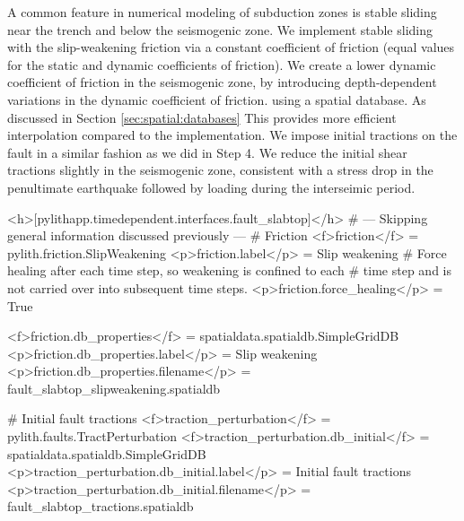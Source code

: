 A common feature in numerical modeling of subduction zones is stable
sliding near the trench and below the seismogenic zone. We implement
stable sliding with the slip-weakening friction via a constant
coefficient of friction (equal values for the static and dynamic
coefficients of friction). We create a lower dynamic coefficient of
friction in the seismogenic zone, by introducing depth-dependent
variations in the dynamic coefficient of friction. using a
 spatial database. As discussed in Section
\vref{sec:spatial:databases} This provides more efficient
interpolation compared to the  implementation.
We impose initial tractions on the fault in a similar fashion as we
did in Step 4. We reduce the initial shear tractions slightly in the
seismogenic zone, consistent with a stress drop in the penultimate
earthquake followed by loading during the interseimic period.
\begin{cfg}
<h>[pylithapp.timedependent.interfaces.fault_slabtop]</h>
# --- Skipping general information discussed previously ---
# Friction
<f>friction</f> = pylith.friction.SlipWeakening
<p>friction.label</p> = Slip weakening
# Force healing after each time step, so weakening is confined to each
# time step and is not carried over into subsequent time steps.
<p>friction.force_healing</p> = True

<f>friction.db_properties</f> = spatialdata.spatialdb.SimpleGridDB
<p>friction.db_properties.label</p> = Slip weakening
<p>friction.db_properties.filename</p> = fault_slabtop_slipweakening.spatialdb

# Initial fault tractions
<f>traction_perturbation</f> = pylith.faults.TractPerturbation
<f>traction_perturbation.db_initial</f> = spatialdata.spatialdb.SimpleGridDB
<p>traction_perturbation.db_initial.label</p> = Initial fault tractions
<p>traction_perturbation.db_initial.filename</p> = fault_slabtop_tractions.spatialdb
\end{cfg}


